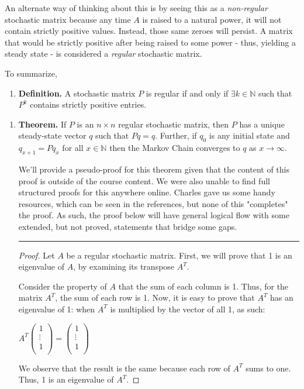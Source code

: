\documentclass{article}
\begin{document}
An alternate way of thinking about this is by seeing this as a \textit{non-regular} stochastic matrix because any time $A$ is raised to a natural power, it will not contain strictly positive values. Instead, those same zeroes will persist. A matrix that would be strictly positive after being raised to some power - thus, yielding a steady state - is considered a \textit{regular} stochastic matrix.

To summarize,

\begin{enumerate}[label=]
    \item \textbf{Definition.} A stochastic matrix $P$ is regular if and only if $\exists k\in\mathbb{N}$ such that $P^k$ contains strictly positive entries.
\end{enumerate}

\begin{enumerate}[label=]
    \item \textbf{Theorem.} If $P$ is an $n\times n$ regular stochastic matrix, then $P$ has a unique steady-state vector $q$ such that $Pq=q$. Further, if $q_0$ is any initial state and $q_{x+1}=Pq_x$ for all $x\in\mathbb{N}$ then the Markov Chain  converges to $q$ as $x \rightarrow \infty$.

    We'll provide a pseudo-proof for this theorem given that the content of this proof is outside of the course content. We were also unable to find full structured proofs for this anywhere online. Charles gave us some handy resources, which can be seen in the references, but none of this "completes" the proof. As such, the proof below will have general logical flow with some extended, but not proved, statements that bridge some gaps.

\rule{\textwidth}{0.5pt}

\begin{proof}

    Let $A$ be a regular stochastic matrix. First, we will prove that 1 is an eigenvalue of $A$, by examining its transpose $A^T.$

    Consider the property of $A$ that the sum of each column is 1. Thus, for the matrix $A^T$, the sum of each row is 1. Now, it is easy to prove that $A^T$ has an eigenvalue of 1: when $A^T$ is multiplied by the vector of all 1, as such:
    \begin{center}  
        $A^T 
        \begin{pmatrix}
            1 \\
            \vdots \\
            1 \\
        \end{pmatrix}
        =
        \begin{pmatrix}
            1 \\
            \vdots \\
            1 \\
        \end{pmatrix}$
    \end{center}
    We observe that the result is the same because each row of $A^T$ sums to one. Thus, 1 is an eigenvalue of $A^T$.


\end{proof}
\end{enumerate}
\end{document}
